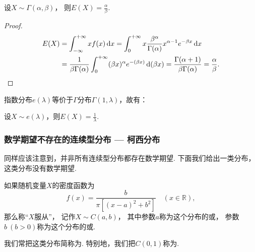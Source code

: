 \begin{theorem}\label{theorem:期望.伽马分布的期望}
设\(X \sim \Gamma(\alpha,\beta)\)，
则\(E(X)=\frac{\alpha}{\beta}\).
\begin{proof}
\begin{align*}
E(X)
&= \int_{-\infty}^{+\infty} x f(x) \dd{x}
= \int_0^{+\infty} x \frac{\beta^\alpha}{\Gamma(\alpha)} x^{\alpha-1} e^{-\beta x} \dd{x} \\
&= \frac{1}{\beta \Gamma(\alpha)} \int_0^{+\infty} (\beta x)^\alpha e^{-(\beta x)} \dd(\beta x)
= \frac{\Gamma(\alpha + 1)}{\beta \Gamma(\alpha)}
= \frac{\alpha}{\beta}.
\qedhere
\end{align*}
\end{proof}
\end{theorem}

指数分布\(e(\lambda)\)等价于\(\Gamma\)分布\(\Gamma(1,\lambda)\)，故有：
\begin{theorem}\label{theorem:随机变量的数字特征.指数分布的数学期望}
设\(X \sim e(\lambda)\)，则\(E(X) = \frac{1}{\lambda}\).
\end{theorem}

\subsubsection{数学期望不存在的连续型分布 --- 柯西分布}
同样应该注意到，并非所有连续型分布都存在数学期望.
下面我们给出一类分布，这类分布没有数学期望.

\begin{definition}
如果随机变量\(X\)的密度函数为\[
	f(x) = \frac{b}{\pi[(x-a)^2+b^2]}
	\quad(x\in\mathbb{R}),
\]
那么称“\(X\)服从”，
记作\(X \sim C(a,b)\)，
其中参数\(a\)称为这个分布的或，
参数\(b\ (b>0)\)称为这个分布的或.

我们常把这类分布简称为.
特别地，我们把\(C(0,1)\)称为.
\end{definition}

